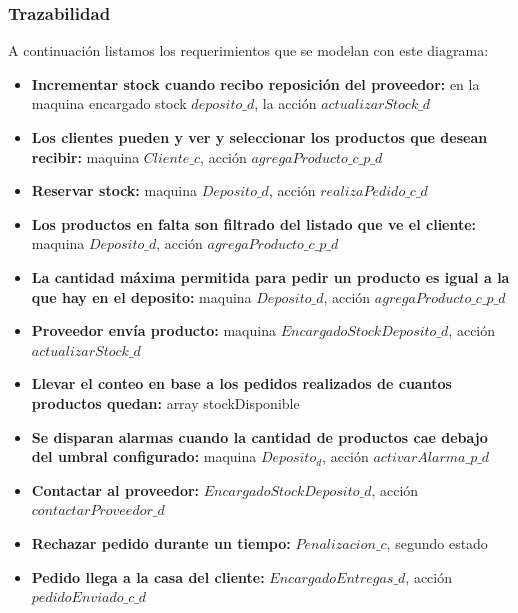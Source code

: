 \subsubsection{Trazabilidad}
A continuación listamos los requerimientos que se modelan con este diagrama:
\begin{itemize}
\item \textbf{Incrementar stock cuando recibo reposición del proveedor:} en la maquina encargado stock $deposito\_d$, la acción $actualizarStock\_d$
\item \textbf{Los clientes pueden y ver y seleccionar los productos que desean recibir:} maquina $Cliente\_c$, acción $agregaProducto\_c\_p\_d$
\item \textbf{Reservar stock:} maquina $Deposito\_d$, acción $realizaPedido\_c\_d$
\item \textbf{Los productos en falta son filtrado del listado que ve el cliente:} maquina $Deposito\_d$, acción $agregaProducto\_c\_p\_d$
\item \textbf{La cantidad máxima permitida para pedir un producto es igual a la que hay en el deposito:} maquina $Deposito\_d$, acción $agregaProducto\_c\_p\_d$
\item \textbf{Proveedor envía producto:} maquina $EncargadoStockDeposito\_d$, acción $actualizarStock\_d$
\item \textbf{Llevar el conteo en base a los pedidos realizados de cuantos productos quedan:}  array stockDisponible
\item \textbf{Se disparan alarmas cuando la cantidad de productos cae debajo del umbral configurado:} maquina $Deposito_d$, acción $activarAlarma\_p\_d$
\item \textbf{Contactar al proveedor:} $EncargadoStockDeposito\_d$, acción $contactarProveedor\_d$
\item \textbf{Rechazar pedido durante un tiempo:} $Penalizacion\_c$, segundo estado
\item \textbf{Pedido llega a la casa del cliente:} $EncargadoEntregas\_d$, acción $pedidoEnviado\_c\_d$
\end{itemize}

\newpage